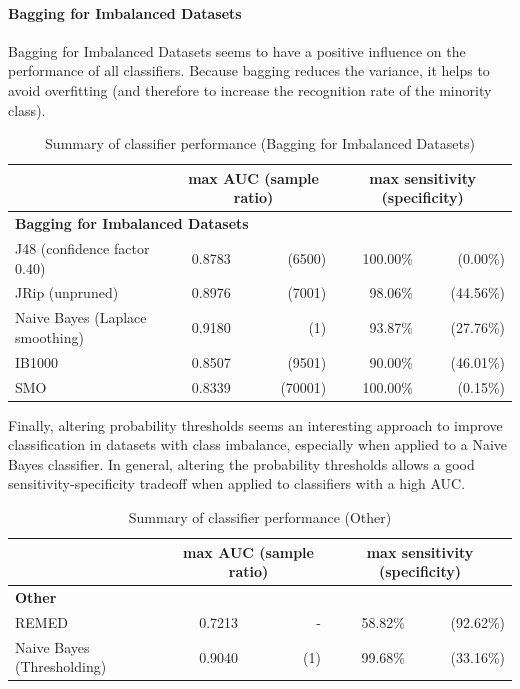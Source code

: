 \paragraph{Bagging for Imbalanced Datasets} Bagging for Imbalanced Datasets seems to have a positive influence on the performance of all classifiers. Because bagging reduces the variance, it helps to avoid overfitting (and therefore to increase the recognition rate of the minority class).

\begin{table}[h]
\centering  
\begin{tabular}{ l | c r | r r|}  
& \multicolumn{2}{c}{max AUC (sample ratio)} & \multicolumn{2}{c}{max sensitivity (specificity)} \\
\hline
\multicolumn{5}{l}{\textbf{Bagging for Imbalanced Datasets}}\\
\hline
J48 (confidence factor 0.40) & 0.8783 & (6500) & 100.00\% & (0.00\%)\\
JRip (unpruned) & 0.8976 & (7001) & 98.06\% & (44.56\%)\\
Naive Bayes (Laplace smoothing) & 0.9180 & (1) & 93.87\% & (27.76\%)\\
IB1000 & 0.8507 & (9501) & 90.00\% & (46.01\%)\\
SMO & 0.8339 & (70001) & 100.00\% & (0.15\%)\\
\hline
\end{tabular}
\label{table:Performance02}
\caption{Summary of classifier performance (Bagging for Imbalanced Datasets)} %
\end{table}

\newpage
Finally, altering probability thresholds seems an interesting approach to improve classification in datasets with class imbalance, especially when applied to a Naive Bayes classifier. In general, altering the probability thresholds allows a good sensitivity-specificity tradeoff when applied to classifiers with a high AUC.

\begin{table}[h]
\centering  
\begin{tabular}{ l | c r | r r|}  
& \multicolumn{2}{c}{max AUC (sample ratio)} & \multicolumn{2}{c}{max sensitivity (specificity)} \\
\hline
\multicolumn{5}{l}{\textbf{Other}}\\
\hline
REMED & 0.7213 & - & 58.82\% & (92.62\%)\\
Naive Bayes (Thresholding) & 0.9040 & (1) & 99.68\% & (33.16\%)\\
\hline                          %
\end{tabular}
\label{table:Performance02}
\caption{Summary of classifier performance (Other)} %
\end{table}



